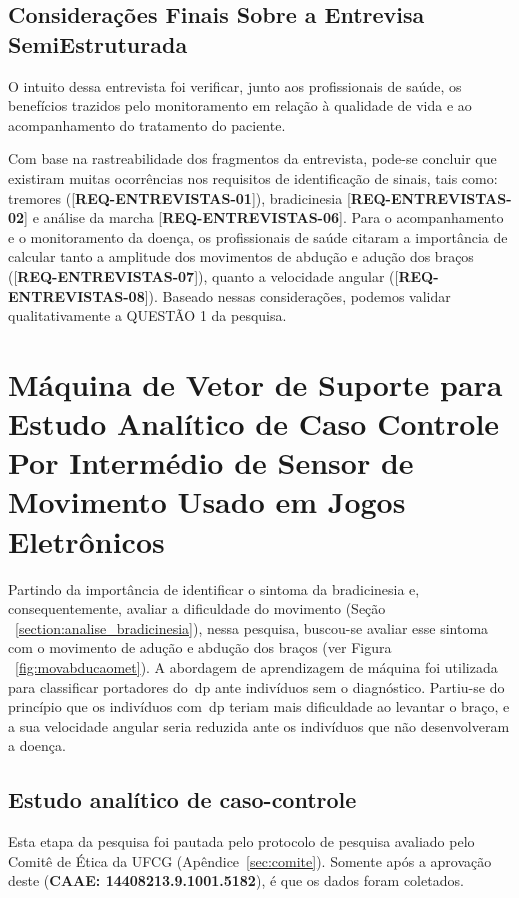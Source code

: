 \subsection{Considerações Finais Sobre a Entrevisa SemiEstruturada}
O intuito dessa entrevista foi verificar, junto aos profissionais de saúde, os benefícios trazidos pelo monitoramento em relação à qualidade de vida e ao acompanhamento do tratamento do paciente.

Com base na rastreabilidade dos fragmentos da entrevista, pode-se concluir que existiram muitas ocorrências nos requisitos de identificação de sinais, tais como: tremores ([\textbf{REQ-ENTREVISTAS-01}]), bradicinesia [\textbf{REQ-ENTREVISTAS-02}] e análise da marcha [\textbf{REQ-ENTREVISTAS-06}]. Para o acompanhamento e o monitoramento da doença, os profissionais de saúde citaram a importância de calcular tanto a amplitude dos movimentos de abdução e adução dos braços ([\textbf{REQ-ENTREVISTAS-07}]), quanto a velocidade angular ([\textbf{REQ-ENTREVISTAS-08}]). Baseado nessas considerações, podemos validar qualitativamente a QUESTÃO 1 da pesquisa.


\section{Máquina de Vetor de Suporte para Estudo Analítico de Caso Controle Por Intermédio de Sensor de Movimento Usado em Jogos Eletrônicos}\label{sec:resultado_svm}

Partindo da importância de identificar o sintoma da bradicinesia e, consequentemente, avaliar a dificuldade do movimento (Seção ~\ref{section:analise_bradicinesia}), nessa pesquisa, buscou-se avaliar esse sintoma com o movimento de adução e abdução dos braços (ver Figura ~\ref{fig:movabducaomet}). A abordagem de aprendizagem de máquina foi utilizada para classificar portadores do~\ac{dp} ante indivíduos sem o diagnóstico. Partiu-se do princípio que os indivíduos com~\ac{dp} teriam mais dificuldade ao levantar o braço, e a sua velocidade angular seria reduzida ante os indivíduos que não desenvolveram a doença.

\subsection{Estudo analítico de caso-controle}\label{section:estudo_caso_controle}
Esta etapa da pesquisa foi pautada pelo protocolo de pesquisa avaliado pelo Comitê de Ética da UFCG (Apêndice~\ref{sec:comite}). Somente após a aprovação deste (\textbf{CAAE: 14408213.9.1001.5182}), é que os dados foram coletados. 


